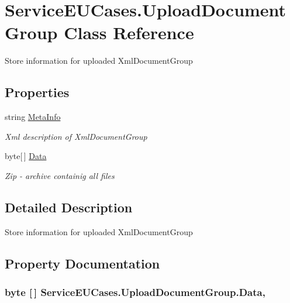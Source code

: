 \hypertarget{class_service_e_u_cases_1_1_upload_document_group}{\section{Service\-E\-U\-Cases.\-Upload\-Document\-Group Class Reference}
\label{class_service_e_u_cases_1_1_upload_document_group}
}


Store information for uploaded Xml\-Document\-Group  


\subsection*{Properties}
\begin{DoxyCompactItemize}
\item 
string \hyperlink{class_service_e_u_cases_1_1_upload_document_group_ac4030d13aa3513aecf5296ada4cd7b85}{Meta\-Info}
\begin{DoxyCompactList}\small\item\em Xml description of Xml\-Document\-Group \end{DoxyCompactList}\item 
byte\mbox{[}$\,$\mbox{]} \hyperlink{class_service_e_u_cases_1_1_upload_document_group_acdadcf6872db18895eba099d6f4aee43}{Data}
\begin{DoxyCompactList}\small\item\em Zip -\/ archive containig all files \end{DoxyCompactList}\end{DoxyCompactItemize}


\subsection{Detailed Description}
Store information for uploaded Xml\-Document\-Group 



\subsection{Property Documentation}
\hypertarget{class_service_e_u_cases_1_1_upload_document_group_acdadcf6872db18895eba099d6f4aee43}{
\subsubsection[{Data}]{\setlength{\rightskip}{0pt plus 5cm}byte \mbox{[}$\,$\mbox{]} Service\-E\-U\-Cases.\-Upload\-Document\-Group.\-Data\hspace{0.3cm}{\ttfamily [get]}, {\ttfamily [set]}}}\label{class_service_e_u_cases_1_1_upload_document_group_acdadcf6872db18895eba099d6f4aee43}


